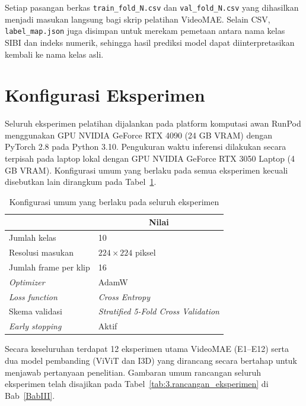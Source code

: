 Setiap pasangan berkas \texttt{train\_fold\_N.csv} dan \texttt{val\_fold\_N.csv} yang dihasilkan menjadi masukan langsung bagi skrip pelatihan VideoMAE. Selain CSV, \texttt{label\_map.json} juga disimpan untuk merekam pemetaan antara nama kelas SIBI dan indeks numerik, sehingga hasil prediksi model dapat diinterpretasikan kembali ke nama kelas asli.\par

\section{Konfigurasi Eksperimen} \label{IV.Konfigurasi}

Seluruh eksperimen pelatihan dijalankan pada platform komputasi awan RunPod menggunakan GPU NVIDIA GeForce RTX 4090 (24 GB VRAM) dengan PyTorch 2.8 pada Python 3.10. Pengukuran waktu inferensi dilakukan secara terpisah pada laptop lokal dengan GPU NVIDIA GeForce RTX 3050 Laptop (4 GB VRAM). Konfigurasi umum yang berlaku pada semua eksperimen kecuali disebutkan lain dirangkum pada Tabel~\ref{tab:4.umum_config}.\par

\begin{table}[H]
\centering
\caption{Konfigurasi umum yang berlaku pada seluruh eksperimen}
\label{tab:4.umum_config}
{\setlength{\tabcolsep}{3pt}
\footnotesize
\begin{tabular}{|l|l|}
\hline
\rowcolor{gray!15} \multicolumn{1}{|c|}{\textbf{Parameter}} & \multicolumn{1}{c|}{\textbf{Nilai}} \\
\hline
Jumlah kelas              & 10 \\
\hline
Resolusi masukan          & $224\times224$ piksel \\
\hline
Jumlah frame per klip     & 16 \\
\hline
\textit{Optimizer}        & AdamW \\
\hline
\textit{Loss function}    & \textit{Cross Entropy} \\
\hline
Skema validasi            & \textit{Stratified 5-Fold Cross Validation} \\
\hline
\textit{Early stopping}   & Aktif \\
\hline
\end{tabular}
}
\end{table}

Secara keseluruhan terdapat 12 eksperimen utama VideoMAE (E1--E12) serta dua model pembanding (ViViT dan I3D) yang dirancang secara bertahap untuk menjawab pertanyaan penelitian. Gambaran umum rancangan seluruh eksperimen telah disajikan pada Tabel~\ref{tab:3.rancangan_eksperimen} di Bab~\ref{BabIII}.\par

